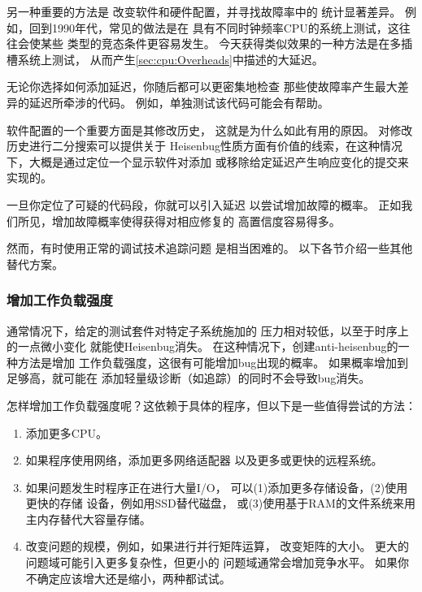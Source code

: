 另一种重要的方法是
改变软件和硬件配置，并寻找故障率中的
统计显著差异。
例如，回到1990年代，常见的做法是在
具有不同时钟频率CPU的系统上测试，这往往会使某些
类型的竞态条件更容易发生。
今天获得类似效果的一种方法是在多插槽系统上测试，
从而产生\cref{sec:cpu:Overheads}中描述的大延迟。

无论你选择如何添加延迟，你随后都可以更密集地检查
那些使故障率产生最大差异的延迟所牵涉的代码。
例如，单独测试该代码可能会有帮助。

软件配置的一个重要方面是其修改历史，
这就是为什么如此有用的原因。
对修改历史进行二分搜索可以提供关于
Heisenbug性质方面有价值的线索，在这种情况下，大概是通过定位一个显示软件对添加
或移除给定延迟产生响应变化的提交来实现的。

\QuickQuizEnd

一旦你定位了可疑的代码段，你就可以引入延迟
以尝试增加故障的概率。
正如我们所见，增加故障概率使得获得对相应修复的
高置信度容易得多。

然而，有时使用正常的调试技术追踪问题
是相当困难的。
以下各节介绍一些其他替代方案。

\subsubsection{增加工作负载强度}
\label{sec:debugging:Increase Workload Intensity}

通常情况下，给定的测试套件对特定子系统施加的
压力相对较低，以至于时序上的一点微小变化
就能使Heisenbug消失。
在这种情况下，创建anti-heisenbug的一种方法是增加
工作负载强度，这很有可能增加bug出现的概率。
如果概率增加到足够高，就可能在
添加轻量级诊断（如追踪）的同时不会导致bug消失。

怎样增加工作负载强度呢？这依赖于具体的程序，但以下是一些值得尝试的方法：

\begin{enumerate}
\item	添加更多CPU。
\item	如果程序使用网络，添加更多网络适配器
	以及更多或更快的远程系统。
\item	如果问题发生时程序正在进行大量I/O，
	可以(1)添加更多存储设备，(2)使用更快的存储
	设备，例如用SSD替代磁盘，
	或(3)使用基于RAM的文件系统来用主内存替代大容量存储。
\item	改变问题的规模，例如，如果进行并行矩阵运算，
	改变矩阵的大小。
	更大的问题域可能引入更多复杂性，但更小的
	问题域通常会增加竞争水平。
	如果你不确定应该增大还是缩小，两种都试试。
\end{enumerate}

